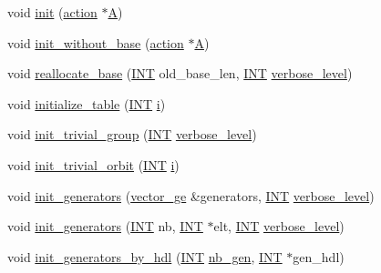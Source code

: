 \begin{DoxyCompactItemize}
\item 
void \mbox{\hyperlink{classsims_a02eb61ed14f75cfe4dc0770142c1bff0}{init}} (\mbox{\hyperlink{classaction}{action}} $\ast$\mbox{\hyperlink{classsims_a3311c97dc08837220191985b1c7ee73f}{A}})
\item 
void \mbox{\hyperlink{classsims_a1010f2dc330b7c5ae10128c0b7dcbefd}{init\+\_\+without\+\_\+base}} (\mbox{\hyperlink{classaction}{action}} $\ast$\mbox{\hyperlink{classsims_a3311c97dc08837220191985b1c7ee73f}{A}})
\item 
void \mbox{\hyperlink{classsims_a9768b0070683ba04b4211aa8d0de7fbd}{reallocate\+\_\+base}} (\mbox{\hyperlink{galois_8h_a09fddde158a3a20bd2dcadb609de11dc}{I\+NT}} old\+\_\+base\+\_\+len, \mbox{\hyperlink{galois_8h_a09fddde158a3a20bd2dcadb609de11dc}{I\+NT}} \mbox{\hyperlink{simeon_8_c_a818073fbcc2f439e7c56952f67386122}{verbose\+\_\+level}})
\item 
void \mbox{\hyperlink{classsims_abe36dd0812bde20447f5aaa8384596a7}{initialize\+\_\+table}} (\mbox{\hyperlink{galois_8h_a09fddde158a3a20bd2dcadb609de11dc}{I\+NT}} \mbox{\hyperlink{alphabet2_8_c_acb559820d9ca11295b4500f179ef6392}{i}})
\item 
void \mbox{\hyperlink{classsims_a6a55a0a4e5124654f999933fd635334a}{init\+\_\+trivial\+\_\+group}} (\mbox{\hyperlink{galois_8h_a09fddde158a3a20bd2dcadb609de11dc}{I\+NT}} \mbox{\hyperlink{simeon_8_c_a818073fbcc2f439e7c56952f67386122}{verbose\+\_\+level}})
\item 
void \mbox{\hyperlink{classsims_ac55702550a4671a721f78345dd9bff70}{init\+\_\+trivial\+\_\+orbit}} (\mbox{\hyperlink{galois_8h_a09fddde158a3a20bd2dcadb609de11dc}{I\+NT}} \mbox{\hyperlink{alphabet2_8_c_acb559820d9ca11295b4500f179ef6392}{i}})
\item 
void \mbox{\hyperlink{classsims_aa2a7908389727bdfa05d034e8d53a818}{init\+\_\+generators}} (\mbox{\hyperlink{classvector__ge}{vector\+\_\+ge}} \&generators, \mbox{\hyperlink{galois_8h_a09fddde158a3a20bd2dcadb609de11dc}{I\+NT}} \mbox{\hyperlink{simeon_8_c_a818073fbcc2f439e7c56952f67386122}{verbose\+\_\+level}})
\item 
void \mbox{\hyperlink{classsims_a2917ebf2dc37af6cfa39310549994d98}{init\+\_\+generators}} (\mbox{\hyperlink{galois_8h_a09fddde158a3a20bd2dcadb609de11dc}{I\+NT}} nb, \mbox{\hyperlink{galois_8h_a09fddde158a3a20bd2dcadb609de11dc}{I\+NT}} $\ast$elt, \mbox{\hyperlink{galois_8h_a09fddde158a3a20bd2dcadb609de11dc}{I\+NT}} \mbox{\hyperlink{simeon_8_c_a818073fbcc2f439e7c56952f67386122}{verbose\+\_\+level}})
\item 
void \mbox{\hyperlink{classsims_a116abb02245f99c0152d867e0e640c77}{init\+\_\+generators\+\_\+by\+\_\+hdl}} (\mbox{\hyperlink{galois_8h_a09fddde158a3a20bd2dcadb609de11dc}{I\+NT}} \mbox{\hyperlink{classsims_a9adf5e45bd4cd2a32df14e1d756535d0}{nb\+\_\+gen}}, \mbox{\hyperlink{galois_8h_a09fddde158a3a20bd2dcadb609de11dc}{I\+NT}} $\ast$gen\+\_\+hdl)

\end{DoxyCompactItemize}
